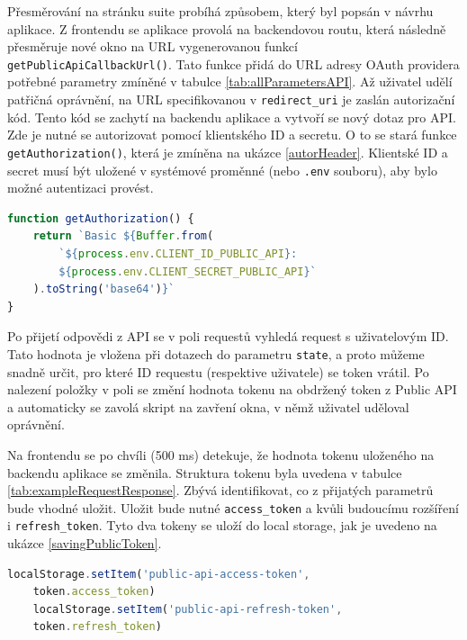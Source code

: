 \documentclass[czech, bc, kiv, he, iso690numb]{fasthesis}
\begin{document}
Přesměrování na stránku suite probíhá způsobem, který byl popsán v návrhu aplikace. Z frontendu se aplikace provolá na backendovou routu, která následně přesměruje nové okno
na URL vygenerovanou funkcí \texttt{getPublicApiCallbackUrl()}. Tato funkce přidá do URL adresy OAuth providera potřebné parametry zmíněné v tabulce \ref{tab:allParametersAPI}.
Až uživatel udělí patřičná oprávnění, na URL specifikovanou v \texttt{redirect\_uri} je zaslán autorizační kód. Tento kód se zachytí na backendu aplikace a
vytvoří se nový dotaz pro API. Zde je nutné se autorizovat pomocí klientského ID a secretu. O to se stará funkce \texttt{getAuthorization()}, která je zmíněna na 
ukázce \ref{autorHeader}. Klientské ID a secret musí být uložené v systémové proměnné (nebo \texttt{.env} souboru), aby bylo možné autentizaci provést.

\begin{lstlisting}[language=Javascript, caption={Vytvoření autorizační hlavičky pro následnou autentizaci}, label=autorHeader]
function getAuthorization() {
	return `Basic ${Buffer.from(
		`${process.env.CLIENT_ID_PUBLIC_API}:
		${process.env.CLIENT_SECRET_PUBLIC_API}`
	).toString('base64')}`
}
\end{lstlisting}

Po přijetí odpovědi z API se v poli requestů vyhledá request s uživatelovým ID. Tato hodnota je vložena při dotazech do parametru \texttt{state}, a proto můžeme snadně
určit, pro které ID requestu (respektive uživatele) se token vrátil. Po nalezení položky v poli se změní hodnota tokenu na obdržený token z Public API a automaticky se
zavolá skript na zavření okna, v němž uživatel uděloval oprávnění.

Na frontendu se po chvíli (500 ms) detekuje, že hodnota tokenu uloženého na backendu aplikace se změnila. Struktura tokenu byla uvedena v tabulce \ref{tab:exampleRequestResponse}.
Zbývá identifikovat, co z přijatých parametrů bude vhodné uložit. Uložit bude nutné \texttt{access\_token} a kvůli budoucímu rozšíření i \texttt{refresh\_token}. Tyto
dva tokeny se uloží do local storage, jak je uvedeno na ukázce \ref{savingPublicToken}.

\begin{lstlisting}[language=Javascript, caption={Ukládání Public API tokenů do local storage}, label=savingPublicToken]
	localStorage.setItem('public-api-access-token', 
	token.access_token)
	localStorage.setItem('public-api-refresh-token', 
	token.refresh_token)
\end{lstlisting}
\end{document}
